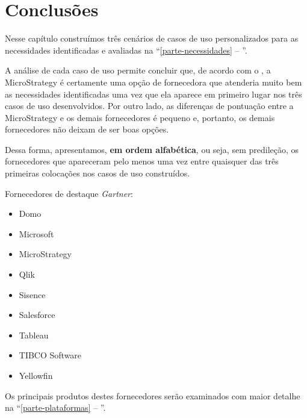 \section{Conclusões}
\label{sec-conclusoes-gartner}

Nesse capítulo construímos três cenários de casos de uso personalizados para as necessidades identificadas e avaliadas na ``\autoref{parte-necessidades} -- ''.

A análise de cada caso de uso permite concluir que, de acordo com o \relGCC, a MicroStrategy é certamente uma opção de fornecedora que atenderia muito bem as necessidades identificadas uma vez que ela aparece em primeiro lugar nos três casos de uso desenvolvidos. Por outro lado, as diferenças de pontuação entre a MicroStrategy e os demais fornecedores é pequeno e, portanto, os demais fornecedores não deixam de ser boas opções.

Dessa forma, apresentamos, \textbf{em ordem alfabética}, ou seja, sem predileção, os fornecedores que apareceram pelo menos uma vez entre quaisquer das três primeiras colocações nos casos de uso construídos.

\begin{env-destaque}{Fornecedores de destaque \emph{Gartner}:}
 \begin{multicols}{2}
    \begin{itemize}
        \item Domo
        \item Microsoft
        \item MicroStrategy
        \item Qlik
        \item Sisence
        \item Salesforce
        \item Tableau
        \item TIBCO Software
        \item Yellowfin
    \end{itemize}
 \end{multicols}
\end{env-destaque}

Os principais produtos destes fornecedores serão examinados com maior detalhe na ``\autoref{parte-plataformas} -- ''.